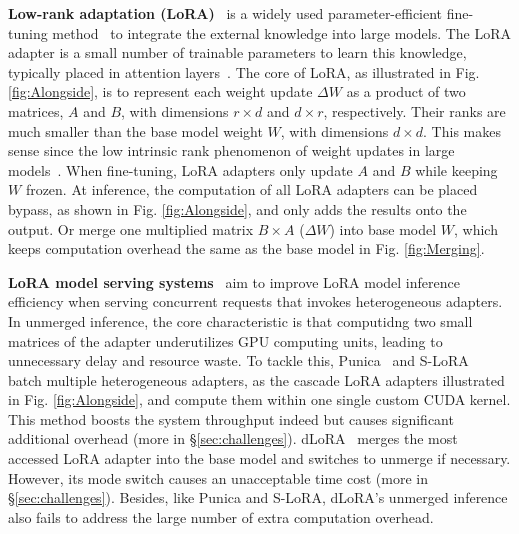 \noindent

\textbf{Low-rank adaptation (LoRA)}~\cite{hu2021lora, dettmers2024qlora, chavan2023one} is a widely used parameter-efficient fine-tuning method~\cite{peft} %
to integrate the external knowledge into large models.
The LoRA adapter is a small number of trainable parameters to learn this knowledge, typically placed in attention layers~\cite{hu2021lora}.
The core of LoRA, as illustrated in Fig. \ref{fig:Alongside}, is to represent each weight update $\Delta W$ as a product of two matrices, $A$ and $B$, with dimensions $r\times d$ and $d\times r$, respectively. 
Their ranks are much smaller than the base model weight $W$, with dimensions $d\times d$.
This makes sense since the low intrinsic rank phenomenon of weight updates in large models~\cite{hu2021lora}.
When fine-tuning, LoRA adapters only update $A$ and $B$ while keeping $W$ frozen. 
At inference, the computation of all LoRA adapters can be placed bypass, as shown in Fig. \ref{fig:Alongside}, and only adds the results onto the output.  
Or merge one multiplied matrix $B\times A$ (\ie $\Delta W$) into base model $W$, which keeps computation overhead the same as the base model in Fig. \ref{fig:Merging}.




\noindent
\textbf{LoRA model serving systems}~\cite{chen2024punica, sheng2023slora, wu2024dlora} aim to improve LoRA model inference efficiency when serving concurrent requests that invokes heterogeneous adapters.
In unmerged inference, the core characteristic is that computidng two small matrices of the adapter underutilizes GPU computing units, leading to unnecessary delay and resource waste.
To tackle this, Punica~\cite{chen2024punica} and S-LoRA~\cite{sheng2023slora} batch multiple heterogeneous adapters, as the cascade LoRA adapters illustrated in Fig. \ref{fig:Alongside}, and compute them within one single custom CUDA kernel.
This method boosts the system throughput indeed but causes significant additional overhead (more in \S \ref{sec:challenges}).
dLoRA~\cite{wu2024dlora} merges the most accessed LoRA adapter into the base model and switches to unmerge if necessary.  %
However, its mode switch causes an unacceptable time cost (more in \S \ref{sec:challenges}).
Besides, like Punica and S-LoRA, dLoRA's unmerged inference also fails to address the large number of extra computation overhead.


